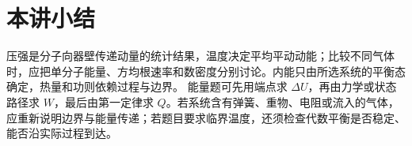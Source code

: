 \section{本讲小结}
压强是分子向器壁传递动量的统计结果，温度决定平均平动动能；比较不同气体时，应把单分子能量、方均根速率和数密度分别讨论。内能只由所选系统的平衡态确定，热量和功则依赖过程与边界。
能量题可先用端点求 $\Delta U$，再由力学或状态路径求 $W$，最后由第一定律求 $Q$。若系统含有弹簧、重物、电阻或流入的气体，应重新说明边界与能量传递；若题目要求临界温度，还须检查代数平衡是否稳定、能否沿实际过程到达。
